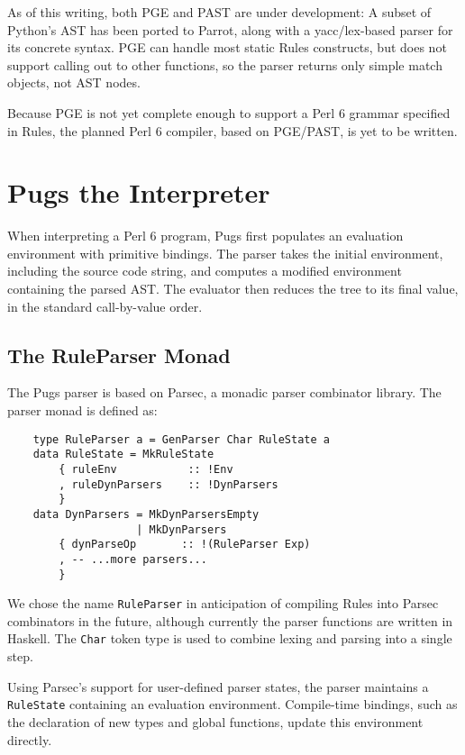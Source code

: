 \documentclass[]{sigplanconf}
\newcommand{\code}[1]{\texttt{#1}}
\begin{document}
As of this writing, both PGE and PAST are under development:  A subset of
Python's AST has been ported to Parrot, along with a yacc/lex-based parser for
its concrete syntax.  PGE can handle most static Rules constructs, but does not
support calling out to other functions, so the parser returns only simple match
objects, not AST nodes.

Because PGE is not yet complete enough to support a Perl 6 grammar specified in
Rules, the planned Perl 6 compiler, based on PGE/PAST, is yet to be written.

\section{Pugs the Interpreter}
\label{sec:PugstheInterpreter}

When interpreting a Perl 6 program, Pugs first populates an evaluation
environment with primitive bindings.  The parser takes the initial
environment, including the source code string, and computes a modified
environment containing the parsed AST.  The evaluator then reduces the tree
to its final value, in the standard call-by-value order.

\subsection{The RuleParser Monad}
\label{sec:TheRuleParserMonad}

The Pugs parser is based on Parsec, a monadic parser combinator library.  The
parser monad is defined as:

\begin{lstlisting}
    type RuleParser a = GenParser Char RuleState a
    data RuleState = MkRuleState
        { ruleEnv           :: !Env
        , ruleDynParsers    :: !DynParsers
        }
    data DynParsers = MkDynParsersEmpty
                    | MkDynParsers
        { dynParseOp       :: !(RuleParser Exp)
        , -- ...more parsers...
        }
\end{lstlisting}

We chose the name \code{RuleParser} in anticipation of compiling Rules into
Parsec combinators in the future, although currently the parser functions are
written in Haskell.  The \code{Char} token type is used to combine lexing and
parsing into a single step.

Using Parsec's support for user-defined parser states, the parser maintains a
\code{RuleState} containing an evaluation environment.  Compile-time bindings, such as
the declaration of new types and global functions, update this environment
directly.
\end{document}
